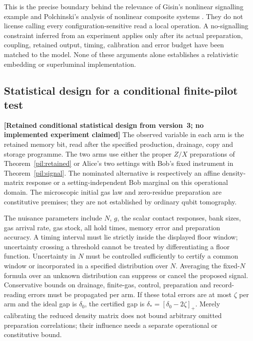 \documentclass[11pt,a4paper]{article}
\theoremstyle{definition}
\theoremstyle{remark}\newtheorem{remark}[theorem]{Remark}
\newcommand{\status}[1]{\textbf{[#1]}\quad}
\begin{document}
This is the precise boundary behind the relevance of Gisin's nonlinear
signalling example \cite{G90} and Polchinski's analysis of nonlinear
composite systems \cite{P91}. They do not license calling every
configuration-sensitive read a local operation. A no-signalling
constraint inferred from an experiment applies only after its actual
preparation, coupling, retained output, timing, calibration and error
budget have been matched to the model. None of these arguments alone
establishes a relativistic embedding or superluminal implementation.


\subsection{Statistical design for a conditional finite-pilot test}
\label{sig:experiment}
\status{Retained conditional statistical design from version~3; no implemented experiment claimed}
The observed variable in each arm is the retained memory bit, read after
the specified production, drainage, copy and storage programme. The two
arms use either the proper $Z/X$ preparations of Theorem~\ref{pil:retained}
or Alice's two settings with Bob's fixed instrument in
Theorem~\ref{pil:signal}. The nominated alternative is respectively an
affine density-matrix response or a setting-independent Bob marginal on
this operational domain. The microscopic initial gas law and zero-residue
preparation are constitutive premises; they are not established by
ordinary qubit tomography.

The nuisance parameters include $N$, $g$, the scalar contact responses,
bank sizes, gas arrival rate, gas stock, all hold times, memory error and
preparation accuracy. A timing interval must lie strictly inside the
displayed floor window; uncertainty crossing a threshold cannot be
treated by differentiating a floor function. Uncertainty in $N$ must be
controlled sufficiently to certify a common window or incorporated in a
specified distribution over $N$. Averaging the fixed-$N$ formula over an
unknown distribution can suppress or cancel the proposed signal.
Conservative bounds on drainage, finite-gas, control, preparation and
record-reading errors must be propagated per arm. If these total errors
are at most $\zeta$ per arm and the ideal gap is $\delta_0$, the certified
gap is $\delta_*=[\delta_0-2\zeta]_+$. Merely calibrating the reduced
density matrix does not bound arbitrary omitted preparation correlations;
their influence needs a separate operational or constitutive bound.
\end{document}
